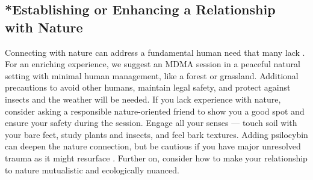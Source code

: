 \documentclass[12pt,letterpaper]{article}
\begin{document}
\subsection{*Establishing or Enhancing a Relationship with Nature}
Connecting with nature can address a fundamental human need that many lack \cite{caoimheGreenspaceOutcomes, baxterNatureRelatedness}. For an enriching experience, we suggest an MDMA session in a peaceful natural setting with minimal human management, like a forest or grassland. Additional precautions to avoid other humans, maintain legal safety, and protect against insects and the weather will be needed. If you lack experience with nature, consider asking a responsible nature-oriented friend to show you a good spot and ensure your safety during the session. Engage all your senses — touch soil with your bare feet, study plants and insects, and feel bark textures. Adding psilocybin can deepen the nature connection, but be cautious if you have major unresolved trauma as it might resurface \cite{forstmannPsilocybinNature}. Further on, consider how to make your relationship to nature mutualistic and ecologically nuanced.
\end{document}
